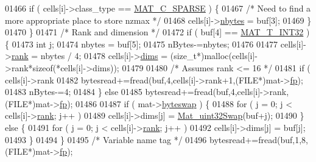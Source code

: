 \begin{DoxyCode}
{{{{{{{{{{{01466                \textcolor{keywordflow}{if} ( cells[i]->class\_type == \hyperlink{group___m_a_t_ggad4d60ae7b709fc81bfd744fb4c857c40a0d5655b7e6178a2242cb3bb56ff4c8d2}{MAT\_C\_SPARSE} ) \{
01467                    \textcolor{comment}{/* Need to find a more appropriate place to store nzmax */}
01468                    cells[i]->\hyperlink{group___m_a_t_abf1c844540503be2df9bb3db93cfe307}{nbytes} = buf[3];
01469                \}
01470             \}
01471             \textcolor{comment}{/* Rank and dimension */}
01472             \textcolor{keywordflow}{if} ( buf[4] == \hyperlink{group___m_a_t_ggacf7b3b879282b7ab3a51190e49bf3453a83e06a68320726c6572bfbb9f3addb1d}{MAT\_T\_INT32} ) \{
01473                 \textcolor{keywordtype}{int} j;
01474                 nbytes = buf[5];
01475                 nBytes-=nbytes;
01476 
01477                 cells[i]->\hyperlink{group___m_a_t_a84ba70c96ded13cc555fa75b768d9921}{rank} = nbytes / 4;
01478                 cells[i]->\hyperlink{group___m_a_t_a8e01234e1c862ce3472bb37f5a09b92c}{dims} = (\textcolor{keywordtype}{size\_t}*)malloc(cells[i]->rank*\textcolor{keyword}{sizeof}(*cells[i]->dims));
01479 
01480                 \textcolor{comment}{/* Assumes rank <= 16 */}
01481                 \textcolor{keywordflow}{if} ( cells[i]->rank %
01482                     bytesread+=fread(buf,4,cells[i]->rank+1,(FILE*)mat->\hyperlink{struct__mat__t_a85f562e407ca9ad4d2a6e14f839432b7}{fp});
01483                     nBytes-=4;
01484                 \} \textcolor{keywordflow}{else}
01485                     bytesread+=fread(buf,4,cells[i]->rank,(FILE*)mat->\hyperlink{struct__mat__t_a85f562e407ca9ad4d2a6e14f839432b7}{fp});
01486 
01487                 \textcolor{keywordflow}{if} ( mat->\hyperlink{struct__mat__t_a99d207977af5e04941ace56d71817a40}{byteswap} ) \{
01488                     \textcolor{keywordflow}{for} ( j = 0; j < cells[i]->\hyperlink{group___m_a_t_a84ba70c96ded13cc555fa75b768d9921}{rank}; j++ )
01489                         cells[i]->dims[j] = \hyperlink{endian_8c_a8cb0d0750e2eaf9840d95db531934f4f}{Mat\_uint32Swap}(buf+j);
01490                 \} \textcolor{keywordflow}{else} \{
01491                     \textcolor{keywordflow}{for} ( j = 0; j < cells[i]->\hyperlink{group___m_a_t_a84ba70c96ded13cc555fa75b768d9921}{rank}; j++ )
01492                         cells[i]->dims[j] = buf[j];
01493                 \}
01494             \}
01495             \textcolor{comment}{/* Variable name tag */}
01496             bytesread+=fread(buf,1,8,(FILE*)mat->\hyperlink{struct__mat__t_a85f562e407ca9ad4d2a6e14f839432b7}{fp});
}}}}}}}}}}}
\end{DoxyCode}
